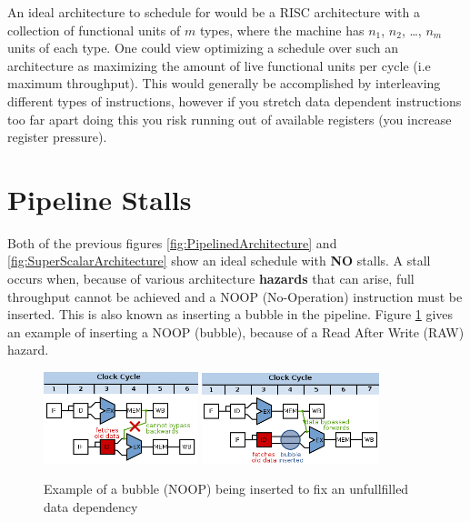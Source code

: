 \documentclass[12pt]{report}
\begin{document}
An ideal architecture to schedule for would be a RISC architecture with
a collection of functional units of \(m\) types, where the machine has \(n_1\),
\(n_2\), \ldots{}, \(n_m\) units of each type. One could view optimizing a schedule over such
an architecture as maximizing the amount of live functional units per
cycle (i.e maximum throughput). This would generally be accomplished by
interleaving different types of instructions, however if you stretch data
dependent instructions too far apart doing this you risk running out of
available registers (you increase register pressure). 

\section{Pipeline Stalls}
\label{sec:org249ae7b}
Both of the previous figures \ref{fig:PipelinedArchitecture} and
\ref{fig:SuperScalarArchitecture} show an ideal schedule with \textbf{NO} stalls. A stall
occurs when, because of various architecture \textbf{hazards} that can arise, full throughput
cannot be achieved and a NOOP (No-Operation) instruction must be inserted.
This is also known as inserting a bubble in the pipeline.
Figure \ref{fig:PipelineStall} gives an example of inserting a NOOP (bubble),
because of a Read After Write (RAW) hazard.

\begin{figure}[!h]
\begin{center}
\includegraphics[width=0.4\textwidth]{figures/bubbles.png}
\includegraphics[width=0.46\textwidth]{figures/bubbles2.png}
\end{center}
\label{fig:PipelineStall}
\caption{Example of a bubble (NOOP) being inserted to fix an unfullfilled data dependency}
\end{figure}
\end{document}
